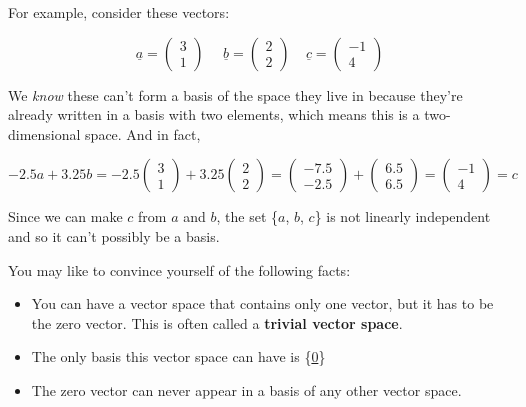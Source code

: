 \documentclass[oneside,english]{amsbook}
\numberwithin{section}{chapter}
\theoremstyle{plain}
\theoremstyle{definition}
\begin{document}
For example, consider these vectors:

\[\underline{a} = \begin{pmatrix}
	3 \\
	1
\end{pmatrix}\ \ \ \ \ \ \underline{b} = \begin{pmatrix}
	2 \\
	2
\end{pmatrix}\ \ \ \ \ \underline{c} = \begin{pmatrix}
	- 1 \\
	4
\end{pmatrix}\]

We \emph{know} these can't form a basis of the space they live in
because they're already written in a basis with two elements, which
means this is a two-dimensional space. And in fact,

\[- 2.5a + 3.25b = - 2.5\begin{pmatrix}
	3 \\
	1
\end{pmatrix} + 3.25\begin{pmatrix}
	2 \\
	2
\end{pmatrix} = \begin{pmatrix}
	- 7.5 \\
	- 2.5
\end{pmatrix} + \begin{pmatrix}
	6.5 \\
	6.5
\end{pmatrix} = \begin{pmatrix}
	- 1 \\
	4
\end{pmatrix} = c\]

Since we can make $c$ from $a$ and $b$, the set \{$a$,
$b$, $c$\} is not linearly independent and so it can't possibly be
a basis.

You may like to convince yourself of the following facts:

\begin{itemize}
	\item
	You can have a vector space that contains only one vector, but it has
	to be the zero vector. This is often called a \textbf{trivial vector
		space}.
	\item
	The only basis this vector space can have is \{\ul{0}\}
	\item
	The zero vector can never appear in a basis of any other vector space.
\end{itemize}
\end{document}
